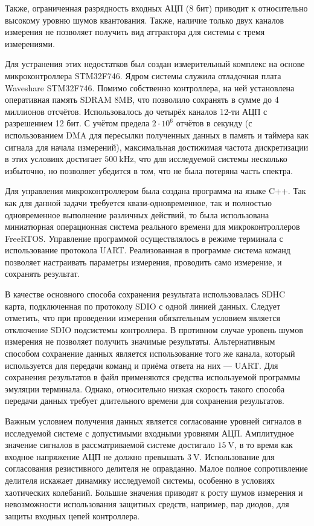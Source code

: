 Также, ограниченная разрядность входных АЦП (8 бит)
приводит к относительно высокому уровню шумов квантования.
Также, наличие только двух каналов измерения не позволяет
получить вид аттрактора для системы с тремя измерениями.

Для устранения этих недостатков был создан
измерительный комплекс на основе
микроконтроллера STM32F746.
Ядром системы служила отладочная плата Waveshare STM32F746.
Помимо собственно контроллера, на ней установлена оперативная память
SDRAM 8MB, что позволило сохранять в сумме до 4 миллионов отсчётов.
Использовалось до четырёх каналов 12-ти АЦП с разрешением 12 бит.
С учётом предела $2 \cdot 10^6$ отчётов в секунду
(с использованием DMA для пересылки полученных данных в память и таймера как сигнала для начала измерений),
максимальная достижимая частота дискретизации в этих условиях достигает $\SI{500}{\kilo\hertz}$,
что для исследуемой системы несколько избыточно,
но позволяет убедится в том, что не была потеряна часть спектра.

Для управления микроконтроллером была создана программа
на языке C++. Так как для данной задачи требуется
квази-одновременное, так и полностью одновременное выполнение
различных действий, то была использована миниатюрная операционная
система реального времени для микроконтроллеров FreeRTOS.
Управление программой осуществлялось в режиме терминала
с использование протокола UART. Реализованная
в программе система команд позволяет настраивать параметры измерения,
проводить само измерение, и сохранять результат.

В качестве основного способа сохранения результата
использовалась SDHC карта, подключенная по протоколу SDIO с одной линией данных.
Следует отметить, что при проведении измерения обязательным условием
является отключение SDIO подсистемы контроллера.
В противном случае уровень шумов измерения не позволяет
получить значимые результаты.
Альтернативным способом сохранение данных является
использование того же канала, который используется для передачи команд
и приёма ответа на них --- UART. Для сохранения результатов в файл
применяются средства используемой программы эмуляции терминала.
Однако, относительно низкая скорость такого способа передачи данных
требует длительного времени для сохранения результатов.

Важным условием получения данных является согласование уровней
сигналов в исследуемой системе с допустимыми входными уровнями АЦП.
Амплитудное значение сигналов в рассматриваемой системе достигало
$\SI{15}{\volt}$, в то время как входное напряжение АЦП не должно
превышать $\SI{3}{\volt}$.
Использование для согласования резистивного делителя
не оправданно. Малое полное сопротивление делителя
искажает динамику исследуемой системы, особенно в условиях
хаотических колебаний. Большие значения приводят
к росту шумов измерения и невозможности
использования защитных средств, например, пар диодов,
для защиты входных цепей контроллера.

